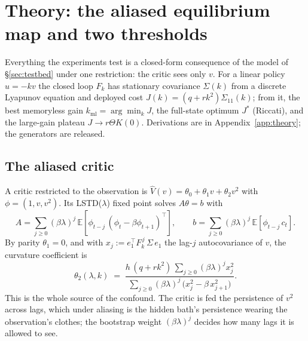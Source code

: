 %
%

\section{Theory: the aliased equilibrium map and two thresholds}
\label{sec:theory}

Everything the experiments test is a closed-form consequence of the model of
\S\ref{sec:testbed} under one restriction: the critic sees only $v$. For a
linear policy $u=-kv$ the closed loop $F_k$ has stationary covariance
$\Sigma(k)$ from a discrete Lyapunov equation and deployed cost
$J(k)=(q+rk^2)\Sigma_{11}(k)$; from it, the best memoryless gain
$k_{\mathrm{ml}}=\arg\min_k J$, the full-state optimum $J^\ast$ (Riccati),
and the large-gain plateau $J\to r\Theta K(0)$. Derivations are in
Appendix~\ref{app:theory}; the generators are released.

\subsection{The aliased critic}

A critic restricted to the observation is $\hat V(v) = \theta_0 + \theta_1 v +
\theta_2 v^2$ with $\phi = (1, v, v^2)$. Its LSTD($\lambda$) fixed point solves
$A\theta = b$ with
\begin{equation}
A = \sum_{j\ge 0} (\beta\lambda)^j\,\mathbb{E}\!\left[\phi_{t-j}\,(\phi_t - \beta\phi_{t+1})^\top\right],
\qquad
b = \sum_{j\ge 0} (\beta\lambda)^j\,\mathbb{E}\!\left[\phi_{t-j}\, c_t\right].
\label{eq:lstd}
\end{equation}
By parity $\theta_1 = 0$, and with $x_j := e_1^\top F_k^{\,j}\,\Sigma\, e_1$
the lag-$j$ autocovariance of $v$, the curvature coefficient is
\begin{equation}
\theta_2(\lambda,k) \;=\; \frac{h\,(q + r k^2)\,\sum_{j\ge 0} (\beta\lambda)^j x_j^2}
{\sum_{j\ge 0} (\beta\lambda)^j\,\bigl(x_j^2 - \beta\, x_{j+1}^2\bigr)}.
\label{eq:theta2}
\end{equation}
This is the whole source of the confound. The critic is fed the persistence of
$v^2$ across lags, which under aliasing is the hidden bath's persistence
wearing the observation's clothes; the bootstrap weight $(\beta\lambda)^j$
decides how many lags it is allowed to see.

